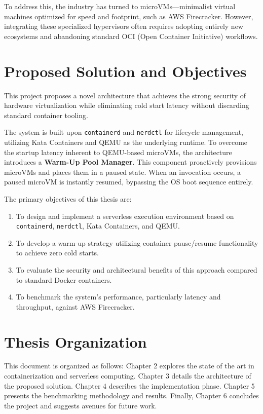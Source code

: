 \documentclass[12pt,a4paper]{report}
\begin{document}
To address this, the industry has turned to microVMs—minimalist virtual machines optimized for speed and footprint, such as AWS Firecracker. However, integrating these specialized hypervisors often requires adopting entirely new ecosystems and abandoning standard OCI (Open Container Initiative) workflows.

\section{Proposed Solution and Objectives}
This project proposes a novel architecture that achieves the strong security of hardware virtualization while eliminating cold start latency without discarding standard container tooling.

The system is built upon \texttt{containerd} and \texttt{nerdctl} for lifecycle management, utilizing Kata Containers and QEMU as the underlying runtime. To overcome the startup latency inherent to QEMU-based microVMs, the architecture introduces a \textbf{Warm-Up Pool Manager}. This component proactively provisions microVMs and places them in a paused state. When an invocation occurs, a paused microVM is instantly resumed, bypassing the OS boot sequence entirely.

The primary objectives of this thesis are:
\begin{enumerate}
    \item To design and implement a serverless execution environment based on \texttt{containerd}, \texttt{nerdctl}, Kata Containers, and QEMU.
    \item To develop a warm-up strategy utilizing container pause/resume functionality to achieve zero cold starts.
    \item To evaluate the security and architectural benefits of this approach compared to standard Docker containers.
    \item To benchmark the system's performance, particularly latency and throughput, against AWS Firecracker.
\end{enumerate}

\section{Thesis Organization}
This document is organized as follows: Chapter 2 explores the state of the art in containerization and serverless computing. Chapter 3 details the architecture of the proposed solution. Chapter 4 describes the implementation phase. Chapter 5 presents the benchmarking methodology and results. Finally, Chapter 6 concludes the project and suggests avenues for future work.
\end{document}

